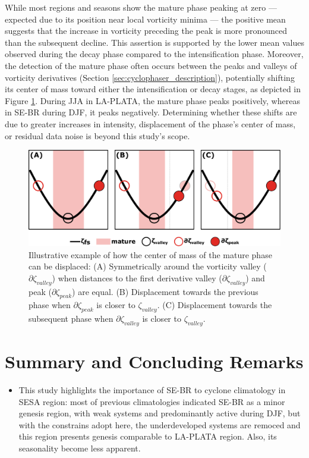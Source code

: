 While most regions and seasons show the mature phase peaking at zero — expected due to its position near local vorticity minima — the positive mean suggests that the increase in vorticity preceding the peak is more pronounced than the subsequent decline. This assertion is supported by the lower mean values observed during the decay phase compared to the intensification phase. Moreover, the detection of the mature phase often occurs between the peaks and valleys of vorticity derivatives (Section \ref{sec:cyclophaser_description}), potentially shifting its center of mass toward either the intensification or decay stages, as depicted in Figure \ref{fig:mature_phase}. During JJA in LA-PLATA, the mature phase peaks positively, whereas in SE-BR during DJF, it peaks negatively. Determining whether these shifts are due to greater increases in intensity, displacement of the phase's center of mass, or residual data noise is beyond this study's scope.

\begin{figure}[h!]
\centering
\includegraphics[width=\textwidth]{figs_4/mature_phase.pdf}
\caption[Mature Phase - Center of Mass]{Illustrative example of how the center of mass of the mature phase can be displaced: (A) Symmetrically around the vorticity valley (\(\partial \zeta_{valley}\)) when distances to the first derivative valley (\(\partial \zeta_{valley}\)) and peak (\(\partial \zeta_{peak}\)) are equal. (B) Displacement towards the previous phase when \(\partial \zeta_{peak}\) is closer to \(\zeta_{valley}\). (C) Displacement towards the subsequent phase when \(\partial \zeta_{valley}\) is closer to \(\zeta_{valley}\).}
\label{fig:mature_phase}
\end{figure}

\section{Summary and Concluding Remarks}

\begin{itemize}
    \item This study highlights the importance of SE-BR to cyclone climatology in SESA region: most of previous climatologies indicated SE-BR as a minor genesis region, with weak systems and predominantly active during DJF, but with the constrains adopt here, the underdeveloped systems are remoced and this region presents genesis comparable to LA-PLATA region. Also, its seasonality become less apparent. 
\end{itemize}

